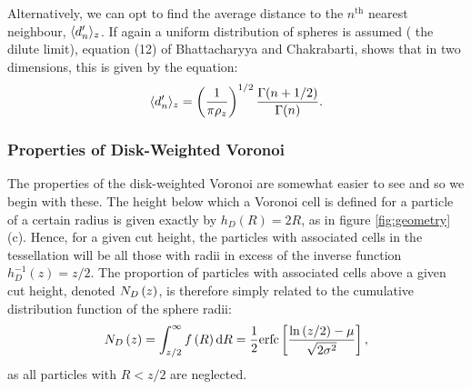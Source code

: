 Alternatively, we can opt to find the average distance to the $n^{\mathrm{th}}$ nearest neighbour, $\langle d^\prime_n \rangle_z$.
If again a uniform distribution of spheres is assumed (\ie{} the dilute limit), equation (12) of Bhattacharyya and Chakrabarti\cite{Bhattacharyya2008}, shows that in two dimensions, this is given by the equation:
\begin{equation}
	\label{eq:nndist}
	\langle d^\prime_n \rangle_z = \left(\frac{1}{\pi\rho_z}\right)^{1/2}\frac{\Gamma{\left(n+1/2\right)}}{\Gamma{\left(n\right)}}.
\end{equation}

\subsubsection{Properties of Disk\--Weighted Voronoi}

The properties of the disk\--weighted Voronoi are somewhat easier to see and so we begin with these.
The height below which a Voronoi cell is defined for a particle of a certain radius is given exactly by $h_D\left(R\right)=2R$, as in figure \ref{fig:geometry}(c).
Hence, for a given cut height, the particles with associated cells in the tessellation will be all those with radii in excess of the inverse function $h_D^{-1}\left(z\right)=z/2$.
The proportion of particles with associated cells above a given cut height, denoted $N_D\left(z\right)$, is therefore simply related to the cumulative distribution function of the sphere radii:
\begin{equation}
	\label{eq:ndz}
	N_D\left(z\right) = \int_{z/2}^\infty f\left(R\right) \text{d}R = \frac{1}{2}\text{erfc}\left[\frac{\ln{\left(z/2\right)}-\mu}{\sqrt{2\sigma^2}}\right],
\end{equation}
as all particles with $R < z/2$ are neglected.

